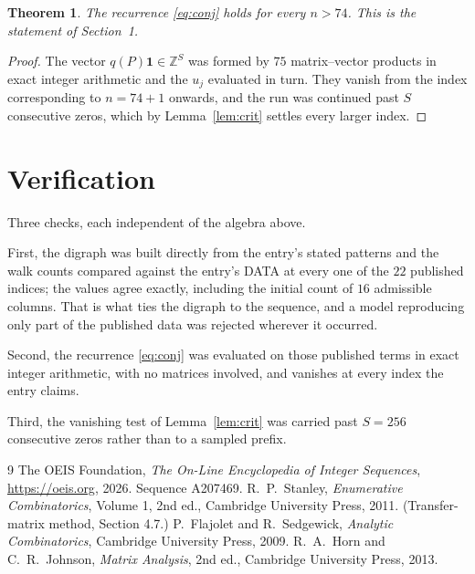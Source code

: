 \documentclass[11pt,a4paper]{article}
\theoremstyle{plain}
\newtheorem{theorem}{Theorem}
\theoremstyle{definition}
\begin{document}
\begin{theorem}
The recurrence \eqref{eq:conj} holds for every $n>74$. This is the statement of
Section~1.
\end{theorem}

\begin{proof}
The vector $q(P)\mathbf{1}\in\mathbb{Z}^{S}$ was formed by $75$ matrix--vector
products in exact integer arithmetic and the $u_j$ evaluated in turn. They vanish from the
index corresponding to $n=74+1$ onwards, and the run was continued past $S$ consecutive
zeros, which by Lemma~\ref{lem:crit} settles every larger index.
\end{proof}

\section{Verification}

Three checks, each independent of the algebra above.

First, the digraph was built directly from the entry's stated patterns and the walk counts
compared against the entry's DATA at every one of the $22$ published indices; the
values agree exactly, including the initial count of $16$ admissible columns. That is
what ties the digraph to the sequence, and a model reproducing only part of the published
data was rejected wherever it occurred.

Second, the recurrence \eqref{eq:conj} was evaluated on those published terms in exact
integer arithmetic, with no matrices involved, and vanishes at every index the entry claims.

Third, the vanishing test of Lemma~\ref{lem:crit} was carried past $S=256$ consecutive
zeros rather than to a sampled prefix.

\begin{thebibliography}{9}
 The OEIS Foundation, \emph{The On-Line Encyclopedia of Integer
Sequences}, \url{https://oeis.org}, 2026. Sequence A207469.
 R.~P.~Stanley, \emph{Enumerative Combinatorics}, Volume 1, 2nd ed.,
Cambridge University Press, 2011. (Transfer-matrix method, Section 4.7.)
 P.~Flajolet and R.~Sedgewick, \emph{Analytic Combinatorics}, Cambridge
University Press, 2009.
 R.~A.~Horn and C.~R.~Johnson, \emph{Matrix Analysis}, 2nd ed., Cambridge
University Press, 2013.
\end{thebibliography}
\end{document}

